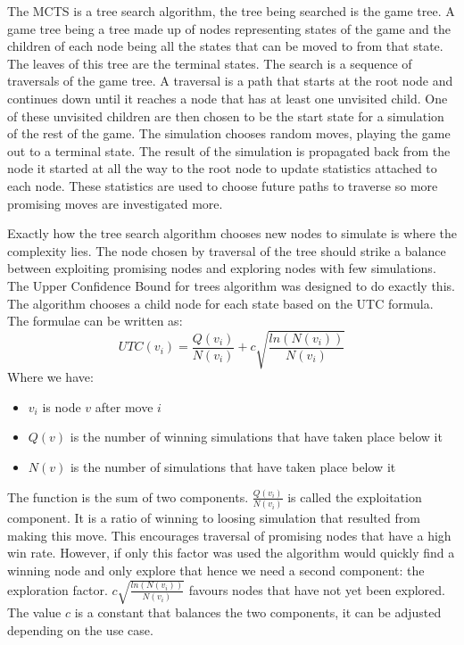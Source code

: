 The MCTS is a tree search algorithm, the tree being searched is the game tree. A game tree being a tree made up of nodes representing states of the game and the children of each node being all the states that can be moved to from that state. The leaves of this tree are the terminal states. The search is a sequence of traversals of the game tree. A traversal is a path that starts at the root node and continues down until it reaches a node that has at least one unvisited child. One of these unvisited children are then chosen to be the start state for a simulation of the rest of the game. The simulation chooses random moves, playing the game out to a terminal state. The result of the simulation is propagated back from the node it started at all the way to the root node to update statistics attached to each node. These statistics are used to choose future paths to traverse so more promising moves are investigated more.

Exactly how the tree search algorithm chooses new nodes to simulate is where the complexity lies. The node chosen by traversal of the tree should strike a balance between exploiting promising nodes and exploring nodes with few simulations. The Upper Confidence Bound for trees algorithm was designed to do exactly this\cite{Kocsis/UCT}. The algorithm chooses a child node for each state based on the UTC formula. The formulae can be written as: \[UTC(v_i) = \frac{Q(v_i)}{N(v_i)} + c\sqrt{\frac{ln(N(v_i))}{N(v_i)}}\] Where we have:
\begin{itemize}
\item $v_i$ is node $v$ after move $i$
\item $Q(v)$ is the number of winning simulations that have taken place below it
\item $N(v)$ is the number of simulations that have taken place below it
\end{itemize}
The function is the sum of two components. $\frac{Q(v_i)}{N(v_i)}$ is called the exploitation component. It is a ratio of winning to loosing simulation that resulted from making this move. This encourages traversal of promising nodes that have a high win rate. However, if only this factor was used the algorithm would quickly find a winning node and only explore that hence we need a second component: the exploration factor. $c\sqrt{\frac{ln(N(v_i))}{N(v_i)}}$ favours nodes that have not yet been explored. The value $c$ is a constant that balances the two components, it can be adjusted depending on the use case.

